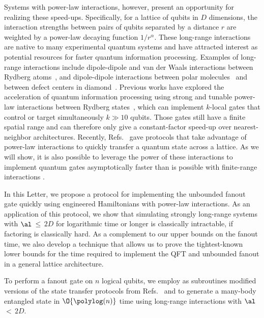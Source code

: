 Systems with power-law interactions, however, present an opportunity for realizing these speed-ups.
Specifically, for a lattice of qubits in $D$ dimensions, the interaction strengths between pairs of qubits separated by a distance $r$ are weighted by a power-law decaying function $1/r^\alpha$.
These long-range interactions are native to many experimental quantum systems and have attracted interest as potential resources for faster quantum information processing. Examples of long-range interactions include dipole-dipole and van der Waals interactions between Rydberg atoms~\cite{Saffman2010,Weimer2012}, and dipole-dipole interactions between polar molecules~\cite{Yan2013} and between defect centers in diamond~\cite{Yao2012,Weimer2012}.
Previous works have explored the acceleration of quantum information processing using strong and tunable power-law interactions between Rydberg states~\cite{Isenhower2011,Molmer2011,Petrosyan2017,Gulliksen2015,Muller2009,Young2020,Levine2019}, which can implement $k$-local gates that control or target simultaneously $k \gg 10$ qubits.
Those gates still have a finite spatial range and can therefore only give a constant-factor speed-up over nearest-neighbor architectures.
Recently, Refs.~\cite{Eldredge2017,Guo2020,Tran2020,kuwaharaStrictlyLinearLight2020} gave protocols that take advantage of power-law interactions to quickly transfer a quantum state across a lattice.
As we will show, it is also possible to leverage the power of these interactions to implement quantum gates asymptotically faster than is possible with finite-range interactions \cite{note_ions}.

In this Letter, we propose a protocol for implementing the unbounded fanout gate quickly using engineered Hamiltonians with power-law interactions.
As an application of this protocol, we show that simulating strongly long-range systems with $\al$\,$\le$\,$2D$ for logarithmic time or longer is classically intractable, if factoring is classically hard.
As a complement to our upper bounds on the fanout time, we also develop a technique that allows us to prove the tightest-known lower bounds for the time required to implement the QFT and unbounded fanout in a general lattice architecture.

To perform a fanout gate on $n$ logical qubits, we
employ as subroutines modified versions of the state transfer protocols from Refs.~\cite{Eldredge2017} and \cite{Tran2021a} to generate a many-body entangled state in $\O{\polylog(n)}$ time using long-range interactions with $\al$\,$<$\,$2D$.

